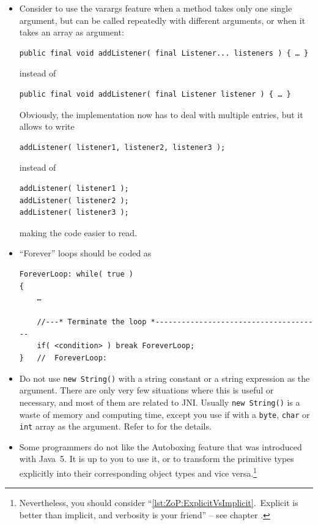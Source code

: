 \begin{itemize}
{\begin{lstlisting}
collection.stream()
    .forEach( this::process );
\end{lstlisting}

The Stream API allows you to filter the elements in the collection.}

\item{Consider to use the varargs feature when a method takes only one single argument, but can be called repeatedly with different arguments, or when it takes an array as argument:

\begin{lstlisting}
public final void addListener( final Listener... listeners ) { … }
\end{lstlisting}

instead of
\begin{lstlisting}
public final void addListener( final Listener listener ) { … }
\end{lstlisting}

Obviously, the implementation now has to deal with multiple entries, but it allows to write
\begin{lstlisting}
addListener( listener1, listener2, listener3 );
\end{lstlisting}
instead of
\begin{lstlisting}
addListener( listener1 );
addListener( listener2 );
addListener( listener3 );
\end{lstlisting}
making the code easier to read.}

\item{“Forever” loops should be coded as
\begin{lstlisting}
ForeverLoop: while( true ) 
{ 
    … 
    
    //---* Terminate the loop *--------------------------------------
    if( <condition> ) break ForeverLoop;
}   //  ForeverLoop:
\end{lstlisting} }

\item{Do not use \lstinline|new String()| with a string constant or a string expression as the argument. There are only very few situations where this is useful or necessary, and most of them are related to JNI. Usually \lstinline|new String()| is a waste of memory and computing time, except you use if with a \lstinline|byte|, \lstinline|char| or \lstinline|int| array as the argument. Refer to \autocite{ORACLE_DOC_STRING_CLASS} for the details.}

\item{Some programmers do not like the Autoboxing feature that was introduced with Java~5. It is up to you to use it, or to transform the primitive types explicitly into their corresponding object types and vice versa.\footnote{Nevertheless, you should consider “\ref{lst:ZoP:ExplicitVsImplicit}.~Explicit is better than implicit, and verbosity is your friend” – see chapter .}}


\end{itemize}
